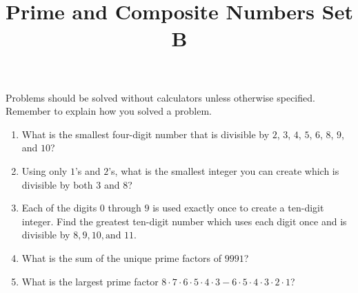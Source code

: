 \documentclass[twocolumn]{article}
\title{Prime and Composite Numbers Set B}
\date{}
\author{}
\begin{document}
\maketitle
\noindent Problems should be solved without calculators unless otherwise
specified. Remember to explain how you solved a problem.
\begin{enumerate}
    \item What is the smallest four-digit number that is divisible by
    $2$, $3$, $4$, $5$, $6$, $8$, $9$, and $10$?
        \vspace{3cm}
    \item Using only $1$'s and $2$'s, what is the smallest integer you can create
        which is divisible by both $3$ and $8$?
        \vspace{3cm}
    \item Each of the digits $0$ through $9$ is used exactly once to create a ten-digit
        integer. Find the greatest ten-digit number which uses each digit once and is
        divisible by $8, 9, 10, \textrm{and } 11$.
        \vspace{3cm}
    \item What is the sum of the unique prime factors of $9991$?
        \vspace{3cm}
    \item What is the largest prime factor $8 \cdot 7 \cdot 6 \cdot 5 \cdot 4 \cdot 3 -
        6 \cdot 5 \cdot 4 \cdot 3 \cdot 2 \cdot 1$?
        \vspace{3cm}
\end{enumerate}
\end{document}
